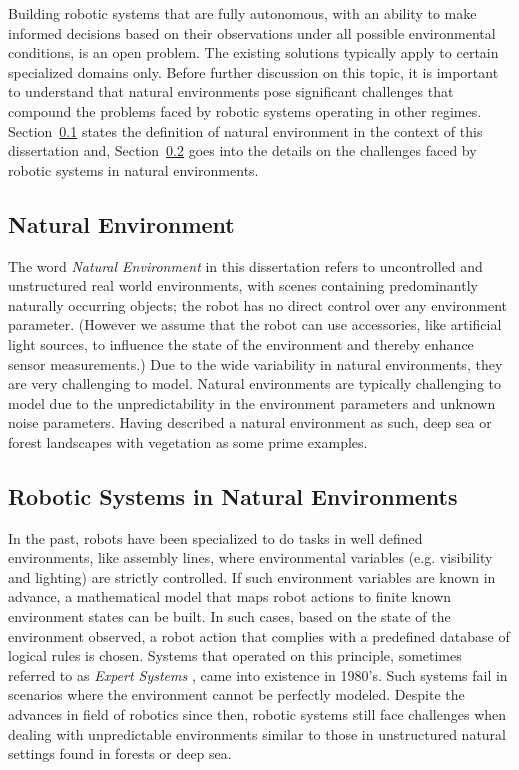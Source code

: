 \documentclass {udthesis}
\begin{document}
Building robotic systems that are fully autonomous, with an ability to make informed decisions based on their observations under all possible environmental conditions, is an open problem.
The existing solutions typically apply to certain specialized domains only. 
Before further discussion on this topic, it is important to
understand that natural environments pose significant challenges that compound the problems faced by robotic systems operating in other regimes.
Section~\ref{sec:nat_environ_def} states the definition of natural environment in the context of this dissertation and, Section~\ref{sec:robots_nat_environ} goes into the details on the challenges faced by robotic systems in natural environments.


\subsection{Natural Environment}
\label{sec:nat_environ_def}

The word \emph{Natural Environment} in this dissertation refers to uncontrolled and unstructured real world environments, with scenes containing predominantly naturally occurring objects; the robot has 
no direct control over any environment parameter. (However we assume that the robot can use accessories, like artificial light sources, to influence the state of the environment and thereby enhance sensor measurements.) 
Due to the wide variability in natural environments, 
they are very challenging to model.
Natural environments are typically challenging to model due to the unpredictability in the environment parameters and unknown noise parameters. 
Having described a natural environment as such, deep sea or forest landscapes with vegetation as some prime examples.


\subsection{Robotic Systems in Natural Environments}
\label{sec:robots_nat_environ}

In the past, robots have been specialized to do tasks in well defined environments, like assembly lines, where environmental variables (e.g. visibility and lighting) are strictly controlled. If such environment variables are known in advance, a mathematical model that maps robot actions to finite known environment states can be built. In such cases, based on the state of the environment observed, a robot action that complies with a predefined database of logical rules is chosen. Systems that operated on this principle, sometimes referred to as \emph{Expert Systems} 
\cite{russel}, came into existence in 1980's. Such systems fail in scenarios where the environment cannot be perfectly modeled. Despite the advances in field of robotics since then, robotic systems still face challenges when dealing with unpredictable environments similar to those in unstructured natural settings found in forests or deep sea.
\end{document}
